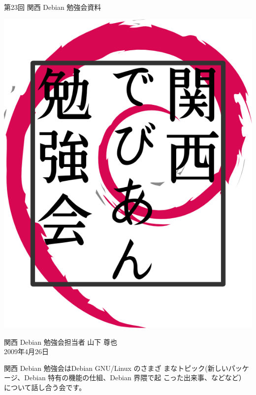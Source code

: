 \documentclass[mingoth,a4paper]{jsarticle}
\newcommand{\debmtgyear}{2009}
\newcommand{\debmtgdate}{26}
\newcommand{\debmtgmonth}{4}
\newcommand{\debmtgnumber}{23}
\begin{document}
\begin{titlepage}


 第\debmtgnumber{}回 関西 Debian 勉強会資料

\vspace{2cm}

\begin{center}
\includegraphics{image200802/kansaidebianlogo.png}
\end{center}

\begin{flushright}
\hfill{}関西 Debian 勉強会担当者 山下 尊也\\
\hfill{}\debmtgyear{}年\debmtgmonth{}月\debmtgdate{}日
\end{flushright}

\thispagestyle{empty}
\end{titlepage}

 
 関西 Debian 勉強会はDebian GNU/Linux のさまざ
 まなトピック(新しいパッケージ、Debian 特有の機能の仕組、Debian 界隈で起
 こった出来事、などなど）について話し合う会です。
\end{document}
